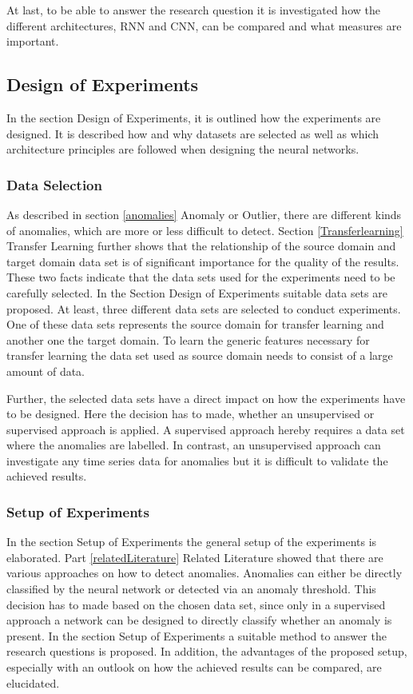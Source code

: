 At last, to be able to answer the research question it is investigated how the different architectures, RNN and CNN, can be compared and what measures are important. 

\subsection{Design of Experiments}
In the section Design of Experiments, it is outlined how the experiments are designed. It is described how and why datasets are selected as well as which architecture principles are followed when designing the neural networks.

\subsubsection{Data Selection}
As described in section \ref{anomalies} Anomaly or Outlier, there are different kinds of anomalies, which are more or less difficult to detect. Section \ref{Transferlearning} Transfer Learning further shows that the relationship of the source domain and target domain data set is of significant importance for the quality of the results. These two facts indicate that the data sets used for the experiments need to be carefully selected. In the Section Design of Experiments suitable data sets are proposed. At least, three different data sets are selected to conduct experiments. One of these data sets represents the source domain for transfer learning and another one the target domain. To learn the generic features necessary for transfer learning the data set used as source domain needs to consist of a large amount of data.

Further, the selected data sets have a direct impact on how the experiments have to be designed. Here the decision has to made, whether an unsupervised or supervised approach is applied. A supervised approach hereby requires a data set where the anomalies are labelled. In contrast, an unsupervised approach can investigate any time series data for anomalies but it is difficult to validate the achieved results. 

\subsubsection{Setup of Experiments}
In the section Setup of Experiments the general setup of the experiments is elaborated. Part \ref{relatedLiterature} Related Literature showed that there are various approaches on how to detect anomalies. Anomalies can either be directly classified by the neural network or detected via an anomaly threshold. This decision has to made based on the chosen data set, since only in a supervised approach a network can be designed to directly classify whether an anomaly is present. In the section Setup of Experiments a suitable method to answer the research questions is proposed. In addition, the advantages of the proposed setup, especially with an outlook on how the achieved results can be compared, are elucidated.   

